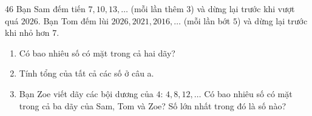 \begin{probbox}{46}{}
Bạn Sam đếm tiến $7, 10, 13,\dots$ (mỗi lần thêm $3$) và dừng lại trước khi vượt quá $2026$. Bạn Tom đếm lùi $2026, 2021, 2016,\dots$ (mỗi lần bớt $5$) và dừng lại trước khi nhỏ hơn $7$.
\begin{enumerate}[label=\alph*),leftmargin=1.6em,itemsep=1pt]
\item Có bao nhiêu số có mặt trong cả hai dãy?
\item Tính tổng của tất cả các số ở câu a.
\item Bạn Zoe viết dãy các bội dương của $4$: $4, 8, 12,\dots$ Có bao nhiêu số có mặt trong cả ba dãy của Sam, Tom và Zoe? Số lớn nhất trong đó là số nào?
\end{enumerate}
\end{probbox}
